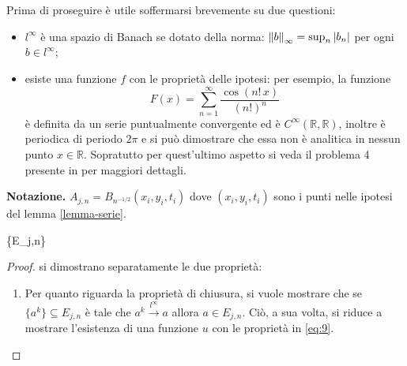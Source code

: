 \begin{example}
\begin{remark}
Prima di proseguire è utile soffermarsi brevemente su due questioni:
\begin{itemize}
\item
$l^{\infty}$ è una spazio di Banach se dotato della norma: $\left\lVert b\right\rVert_\infty=\sup_n|b_n|$ per ogni $b \in l^{\infty}$;
\item
esiste una funzione $f$ con le proprietà delle ipotesi: per esempio, la funzione $$F(x)=\sum_{n=1}^\infty\frac{\cos(n!\,x)}{(n!)^n}$$ è definita da un serie puntualmente convergente ed è $C^{\infty}(\mathbb{R},\mathbb{R})$, inoltre è periodica di periodo $2\pi$ e si può dimostrare che essa non è analitica in nessun punto $x\in\mathbb{R}$. Sopratutto per quest'ultimo aspetto si veda il problema 4 presente in \cite[cap.3]{John} per maggiori dettagli.
\end{itemize}
\end{remark}
\textbf{Notazione.} $A_{j,n} = B_{n^{-1/2}}(x_i,y_i,t_i)$ dove $(x_i,y_i,t_i)$ sono i punti nelle ipotesi del lemma \ref{lemma-serie}.
\begin{lemma}\label{lemma-e}
{\{E_{j,n}\} }
\end{lemma}

\begin{proof} 
si dimostrano separatamente le due proprietà:
\begin{enumerate}
\item
Per quanto riguarda la proprietà di chiusura, si vuole mostrare che se $\{a^k\}\subseteq E_{j,n}$ è tale che $a^k \xrightarrow{l^\infty} a$ allora $a \in E_{j,n}$. Ciò, a sua volta, si riduce a mostrare l'esistenza di una funzione $u$ con le proprietà in \eqref{eq:9}.


\end{enumerate}
\end{proof}
\end{example}

